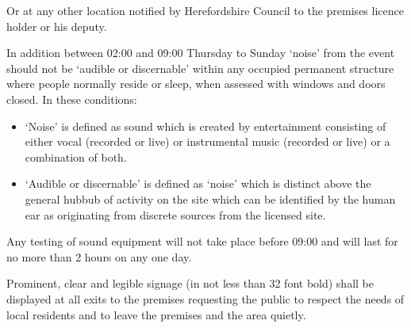 Or at any other location notified by Herefordshire Council to the
premises licence holder or his deputy.

In addition between 02:00 and 09:00 Thursday to Sunday `noise' from the
event should not be `audible or discernable' within any occupied
permanent structure where people normally reside or sleep, when assessed
with windows and doors closed. In these conditions:
\begin{itemize}
    \item `Noise' is defined as sound which is created by entertainment
          consisting of either vocal (recorded or live) or instrumental
          music (recorded or live) or a combination of both.

    \item `Audible or discernable' is defined as `noise' which is distinct
          above the general hubbub of activity on the site which can be identified
          by the human ear as originating from discrete sources from the licensed
          site.
\end{itemize}


Any testing of sound equipment will not take place before 09:00 and
will last for no more than 2 hours on any one day.

Prominent, clear and legible signage (in not less than 32 font bold)
shall be displayed at all exits to the premises requesting the public to
respect the needs of local residents and to leave the premises and the
area quietly.

